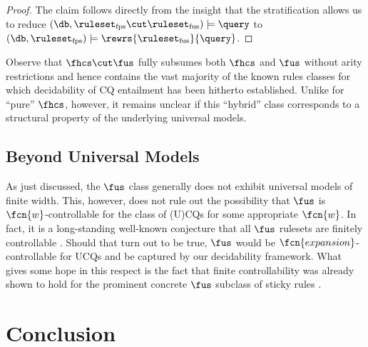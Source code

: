 \begin{proof} The claim follows directly from the insight that the stratification allows us to reduce  $(\db,\ruleset_\mathrm{fps} \cut \ruleset_\mathrm{fus}) \models \query$ to
$(\db,\ruleset_\mathrm{fps}) \models \rewrs{\ruleset_\mathrm{fus}}{\query}$.
\end{proof}

Observe that $\fhcs \cut \fus$ fully subsumes both $\fhcs$ and $\fus$ without arity restrictions and hence contains the vast majority of the known rules classes for which decidability of CQ entailment has been hitherto established. Unlike for ``pure'' $\fhcs$, however, it remains unclear if this ``hybrid'' class corresponds to a structural property of the underlying universal models.  


\subsection{Beyond Universal Models}
%
As just discussed, the $\fus$ class generally does not exhibit universal models of finite width. This, however, does not rule out the possibility that $\fus$ is $\fcn{w}$-controllable for the class of (U)CQs for some appropriate $\fcn{w}$. In fact, it is a long-standing well-known conjecture that all $\fus$ rulesets are finitely controllable \cite{GogaczM13a,GogaczM13}. Should that turn out to be true, $\fus$ would be $\fcn{expansion}$-controllable for UCQs and be captured by our decidability framework. What gives some hope in this respect is the fact that finite controllability was already shown to hold for the prominent concrete $\fus$ subclass of sticky rules \cite{GogaczM13a,GogaczM17}. %


  
  


\section{Conclusion}

